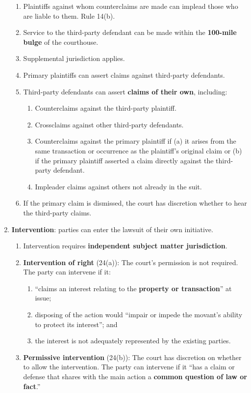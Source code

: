 \begin{enumerate}
\begin{enumerate}
        \item Plaintiffs against whom counterclaims are made can implead those 
        who are liable to them. Rule 14(b).
        \item Service to the third-party defendant can be made within the 
        \textbf{100-mile bulge} of the courthouse.
        \item Supplemental jurisdiction applies.
        \item Primary plaintiffs can assert claims against third-party 
        defendants.
        \item Third-party defendants can assert \textbf{claims of their own}, 
        including:
        \begin{enumerate}
            \item Counterclaims against the third-party plaintiff.
            \item Crossclaims against other third-party defendants.
            \item Counterclaims against the primary plaintiff if (a) it arises 
            from the same transaction or occurrence as the plaintiff's 
            original claim or (b) if the primary plaintiff asserted a claim 
            directly against the third-party defendant.
            \item Impleader claims against others not already in the suit.
        \end{enumerate}
        \item If the primary claim is dismissed, the court has discretion 
        whether to hear the third-party claims.
    \end{enumerate}
    \item \textbf{Intervention}: parties can enter the lawsuit of their own 
    initiative.
    \begin{enumerate}
        \item Intervention requires \textbf{independent subject matter 
        jurisdiction}.
        \item \textbf{Intervention of right} (24(a)): The court's permission is not 
        required. The party can intervene if it:
        \begin{enumerate}
            \item ``claims an interest relating to the \textbf{property or 
            transaction}'' at issue;
            \item disposing of the action would ``impair or impede the 
            movant's ability to protect its interest''; and
            \item the interest is not adequately represented by the existing 
            parties. 
        \end{enumerate}
        \item \textbf{Permissive intervention} (24(b)): The court has discretion on 
        whether to allow the intervention. The party can intervene if it ``has 
        a claim or defense that shares with the main action a \textbf{common 
        question of law or fact}.''
    \end{enumerate}
\end{enumerate}

